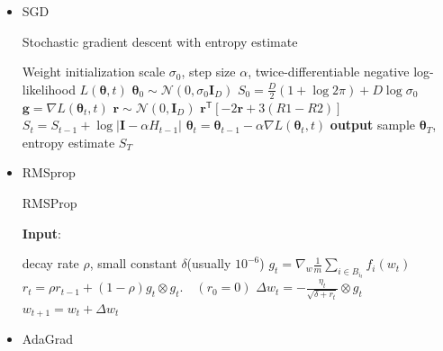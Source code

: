 \documentclass{article}
\newcommand{\stepsize}{\alpha}
\newcommand{\params}{\mathbf{\theta}}
\newcommand{\entropy}{S}
\newcommand{\vI}{\mathbf{I}}
\newcommand{\gradparams}{\nabla L(\params_t, t)}
\newcommand{\N}[2]{\mathcal{N}\!\left(#1,#2\right)}
\newcommand{\vg}{\mathbf{g}}
\newcommand{\vr}{\mathbf{r}}
\newcommand{\tra}{^{\mathsf{T}}}
\begin{document}
\begin{itemize}

  \item SGD

    \begin{algorithm}[H]
      \caption{Stochastic gradient descent with entropy estimate}
      \begin{algorithmic}[1]
        Weight initialization scale $\sigma_0$, step size $\stepsize$,
        twice-differentiable negative log-likelihood $L(\params, t)$
         $\params_0 \sim \N{0}{\sigma_0 \vI_D}$
         $\entropy_{0} = \frac{D}{2} (1 + \log 2 \pi) + D \log\sigma_0$
          \State $\vg = \gradparams$ 
          \State $\vr \sim \N{0}{\vI_D}$ 
          \State $\vr\tra \left[ -2 \vr + 3 \left(  R1 - R2 \right) \right]$ 
          \State $\entropy_{t} = \entropy_{t-1} + \log \left| \vI - \stepsize H_{t-1} \right|$ 
          \State $\params_{t} = \params_{t-1} - \stepsize \gradparams$ 
        \EndFor
        \State \textbf{output} sample $\params_T$, entropy estimate $\entropy_T$
      \end{algorithmic}
    \end{algorithm}

  \item RMSprop

    \begin{algorithm}[H]
      \caption{RMSProp}
      {\bf Input}:
      \begin{algorithmic}[1]
         decay rate $\rho$, small constant $\delta$(usually $10^{-6}$)
          \State $g_t = \nabla_{w} \frac{1}{m} \sum_{i \in B_{i_t}} f_i(w_{t})$ 
          \State $r_t = \rho r_{t-1} + (1-\rho)g_t \otimes g_t. \quad (r_0 = 0)$ 
          \State $\Delta w_t = -\frac{\eta_t}{\sqrt{\delta + {r_t}}} \otimes g_t$ 
          \State $w_{t+1} = w_t + \Delta w_t$ 
        \EndFor
      \end{algorithmic}
    \end{algorithm}

  \item AdaGrad


\end{itemize}
\end{document}
